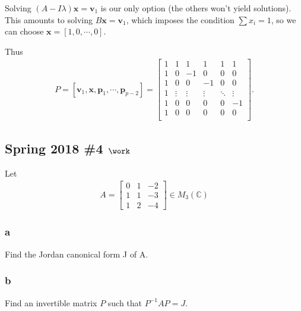 \begin{solution}
Solving \((A-I\lambda)\mathbf{x} = \mathbf{v}_1\) is our only option
(the others won't yield solutions). This amounts to solving
\(B\mathbf{x} = \mathbf{v}_1\), which imposes the condition
\(\sum x_i = 1\), so we can choose \(\mathbf{x} = [1, 0, \cdots, 0]\).

Thus
\begin{align*}
P = [\mathbf{v}_1, \mathbf{x}, \mathbf{p}_1, \cdots, \mathbf{p}_{p-2}] =
\left[\begin{array}{rrrrrr}
1 & 1 & 1 & 1 & 1 & 1  \\
1 & 0 & -1 & 0 & 0 & 0 \\
1 & 0 & 0 & -1 & 0 & 0 \\
1 & \vdots & \vdots & \vdots & \ddots & \vdots \\
1 & 0 & 0 & 0 & 0 & -1\\
1 & 0 & 0 & 0 & 0 & 0 \\
\end{array}\right]
.\end{align*}

\end{solution}

\hypertarget{spring-2018-4-work}{%
\subsection{\texorpdfstring{Spring 2018 \#4
\(\work\)}{Spring 2018 \#4 \textbackslash work}}\label{spring-2018-4-work}}

Let
\begin{align*}
A=\left[\begin{array}{lll}{0} & {1} & {-2} \\ {1} & {1} & {-3} \\ {1} & {2} & {-4}\end{array}\right] \in M_{3}(\mathbb{C})
\end{align*}

\hypertarget{a-112}{%
\subsubsection{a}\label{a-112}}

Find the Jordan canonical form J of A.

\hypertarget{b-102}{%
\subsubsection{b}\label{b-102}}

Find an invertible matrix \(P\) such that \(P^{-1}AP = J\).

